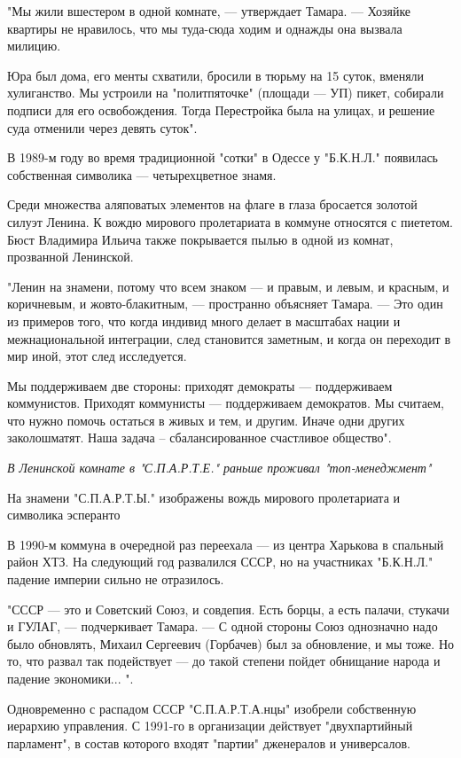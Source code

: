 "Мы жили вшестером в одной комнате, --- утверждает Тамара. --- Хозяйке квартиры не
нравилось, что мы туда-сюда ходим и однажды она вызвала милицию. 

Юра был дома, его менты схватили, бросили в тюрьму на 15 суток, вменяли
хулиганство. Мы устроили на "политпяточке" (площади --- УП) пикет, собирали
подписи для его освобождения. Тогда Перестройка была на улицах, и решение суда
отменили через девять суток".

В 1989-м году во время традиционной "сотки" в Одессе у "Б.К.Н.Л." появилась
собственная символика --- четырехцветное знамя.

Среди множества аляповатых элементов на флаге в глаза бросается золотой силуэт
Ленина. К вождю мирового пролетариата в коммуне относятся с пиететом. Бюст
Владимира Ильича также покрывается пылью в одной из комнат, прозванной
Ленинской.

"Ленин на знамени, потому что всем знаком --- и правым, и левым, и красным, и
коричневым, и жовто-блакитным, --- пространно объясняет Тамара. --- Это один из
примеров того, что когда индивид много делает в масштабах нации и
межнациональной интеграции, след становится заметным, и когда он переходит в
мир иной, этот след исследуется. 

Мы поддерживаем две стороны: приходят демократы --- поддерживаем коммунистов.
Приходят коммунисты --- поддерживаем демократов. Мы считаем, что нужно помочь
остаться в живых и тем, и другим. Иначе одни других заколошматят. Наша задача –
сбалансированное счастливое общество".

{\em
В Ленинской комнате в "С.П.А.Р.Т.Е." раньше проживал "топ-менеджмент"
\/}

На знамени "С.П.А.Р.Т.Ы." изображены вождь мирового пролетариата и символика
эсперанто

В 1990-м коммуна в очередной раз переехала --- из центра Харькова в спальный
район ХТЗ. На следующий год развалился СССР, но на участниках "Б.К.Н.Л."
падение империи сильно не отразилось.

"СССР --- это и Советский Союз, и совдепия. Есть борцы, а есть палачи, стукачи и
ГУЛАГ, --- подчеркивает Тамара. --- С одной стороны Союз однозначно надо было
обновлять, Михаил Сергеевич (Горбачев) был за обновление, и мы тоже. Но то, что
развал так подействует --- до такой степени пойдет обнищание народа и падение
экономики... ".

Одновременно с распадом СССР "С.П.А.Р.Т.А.нцы" изобрели собственную иерархию
управления. С 1991-го в организации действует "двухпартийный парламент", в
состав которого входят "партии" дженералов и универсалов. 

